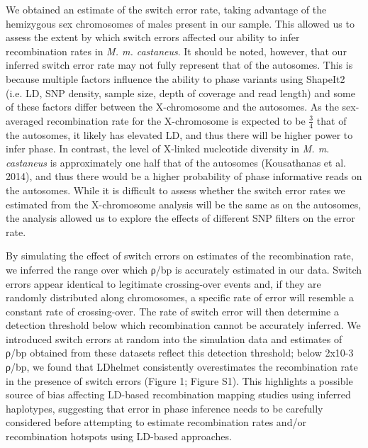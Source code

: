         	We obtained an estimate of the switch error rate, taking advantage of the hemizygous sex chromosomes of males present in our sample. This allowed us to assess the extent by which switch errors affected our ability to infer recombination rates in \emph{M. m. castaneus}. It should be noted, however, that our inferred switch error rate may not fully represent that of the autosomes. This is because multiple factors influence the ability to phase variants using ShapeIt2 (i.e. LD, SNP density, sample size, depth of coverage and read length) and some of these factors differ between the X-chromosome and the autosomes. As the sex-averaged recombination rate for the X-chromosome is expected to be \( \frac{3}{4} \) that of the autosomes, it likely has elevated LD, and thus there will be higher power to infer phase. In contrast, the level of X-linked nucleotide diversity in \emph{M. m. castaneus} is approximately one half that of the autosomes (Kousathanas et al. 2014), and thus there would be a higher probability of phase informative reads on the autosomes. While it is difficult to assess whether the switch error rates we estimated from the X-chromosome analysis will be the same as on the autosomes, the analysis allowed us to explore the effects of different SNP filters on the error rate.

By simulating the effect of switch errors on estimates of the recombination rate, we inferred the range over which ρ/bp is accurately estimated in our data. Switch errors appear identical to legitimate crossing-over events and, if they are randomly distributed along chromosomes, a specific rate of error will resemble a constant rate of crossing-over. The rate of switch error will then determine a detection threshold below which recombination cannot be accurately inferred. We introduced switch errors at random into the simulation data and estimates of ρ/bp obtained from these datasets reflect this detection threshold; below 2x10-3 ρ/bp, we found that LDhelmet consistently overestimates the recombination rate in the presence of switch errors (Figure 1; Figure S1). This highlights a possible source of bias affecting LD-based recombination mapping studies using inferred haplotypes, suggesting that error in phase inference needs to be carefully considered before attempting to estimate recombination rates and/or recombination hotspots using LD-based approaches.
 
